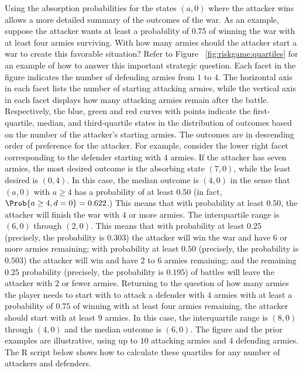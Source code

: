 \documentclass[12pt]{article}
\begin{document}
Using the absorption probabilities for the states \( (a, 0) \) where the
attacker wins allows a more detailed summary of the outcomes of the war.
As an example, suppose the attacker wants at least a probability of \(
0.75 \) of winning the war with at least four armies surviving.  With
how many armies should the attacker start a war to create this favorable
situation?  Refer to Figure~%
\ref{fig:riskgame:quartiles} for an example of how to answer this
important strategic question.  Each facet in the figure indicates the
number of defending armies from \( 1 \) to \( 4 \).  The horizontal axis
in each facet lists the number of starting attacking armies, while the
vertical axis in each facet displays how many attacking armies remain
after the battle.  Respectively, the blue, green and red curves with
points indicate the first-quartile, median, and third-quartile states in
the distribution of outcomes based on the number of the attacker's
starting armies.  The outcomes are in descending order of preference for
the attacker.  For example, consider the lower right facet corresponding
to the defender starting with \( 4 \) armies.  If the attacker has seven
armies, the most desired outcome is the absorbing state \( (7,0) \),
while the least desired is \( (0,4) \).  In this case, the median
outcome is \( (4,0) \) in the sense that \( (a,0) \) with \( a \ge 4 \)
has a probability of at least \( 0.50 \) (in fact, \( \Prob{a \ge 4, d =
0} = 0.622 \).) This means that with probability at least \( 0.50 \),
the attacker will finish the war with \( 4 \) or more armies.  The
interquartile range is \( (6,0) \) through \( (2,0) \).  This means that
with probability at least \( 0.25 \) (precisely, the probability is \(
0.303 \)) the attacker will win the war and have \( 6 \) or more armies
remaining; with probability at least \( 0.50 \) (precisely, the
probability is \( 0.503 \)) the attacker will win and have \( 2 \) to \(
6 \) armies remaining; and the remaining \( 0.25 \) probability (precisely,
the probability is \( 0.195 \)) of battles will leave the attacker with \(
2 \) or fewer armies.  Returning to the question of how many armies the
player needs to start with to attack a defender with \( 4 \) armies with
at least a probability of \( 0.75 \) of winning with at least four
armies remaining, the attacker should start with at least \( 9 \)
armies.  In this case, the interquartile range is \( (8,0) \) through \(
(4,0) \) and the median outcome is \( (6,0) \).  The figure and the
prior examples are illustrative, using up to \( 10 \) attacking armies
and \( 4 \) defending armies.  The R script below shows how to calculate
these quartiles for any number of attackers and defenders.
\end{document}
